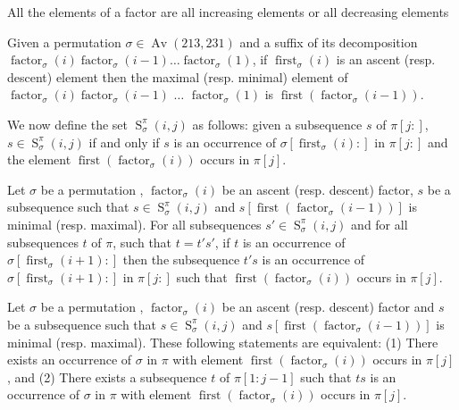 \documentclass[a4paper]{llncs}
\DeclareMathOperator{\AV}{Av}
\newcommand{\ptext}{\pi}
\newcommand{\pmotif}{\sigma}
\DeclareMathOperator{\firstia}{first}
\newcommand{\firsti}[2]{\firstia_{{#1}}({#2})}
\DeclareMathOperator{\factora}{factor}
\newcommand{\factor}[2]{\factora_{{#1}}({#2})}
\DeclareMathOperator{\firsta}{first}
\newcommand{\first}[2]{\firsta(\factor{#1}{#2})}
\DeclareMathOperator{\SETa}{S}
\newcommand{\SET}[4]{\SETa_{{#1}}^{{#2}}({#3},{#4})}
\begin{document}
\begin{remark}
All the elements of a factor are all increasing elements or all decreasing elements
\end{remark}

\begin{lemma}
\label{lemma:whereIsMax}
Given a permutation $\sigma \in \AV(213,231)$ and a suffix of its 
decomposition $\factor{\sigma}{i}\factor{\sigma}{i-1}\ldots$$\factor{\sigma}{1}$, 
if $\firsti{\sigma}{i}$ is an ascent (resp. descent) element then the maximal 
(resp. minimal) element of $\factor{\sigma}{i}\factor{\sigma}{i-1}$ $\ldots$ $\factor{\sigma}{1}$ is 
$\first{\sigma}{i-1}$.
\end{lemma}

We now define the set
$\SET{\pmotif}{\ptext}{i}{j}$ as follows:
given a subsequence $s$ of $\ptext[j:]$,
$s \in \SET{\pmotif}{\ptext}{i}{j}$ if and only if
$s$ is an occurrence of $\pmotif[\firsti{\pmotif}{i}:]$ in $\ptext[j:]$
and the element $\first{\pmotif}{i}$ occurs in $\ptext[j]$.

\begin{lemma}
\label{lemma:ts}
Let $\pmotif$ be a permutation , 
$\factor{\pmotif}{i}$ be an ascent (resp. descent) factor,
$s$ be a subsequence such that $s \in \SET{\pmotif}{\ptext}{i}{j}$ and $s[\first{\pmotif}{i-1}]$ is minimal (resp. maximal). 
For all subsequences 
$s' \in \SET{\pmotif}{\ptext}{i}{j}$ and for all subsequences $t$ of $\ptext$, such that $t=t's'$, if $t$ is an occurrence of $\pmotif[\firsti{\pmotif}{i+1}:]$ then the subsequence $t's$ is an occurrence of $\pmotif[\firsti{\pmotif}{i+1}:]$ in $\ptext[j:]$ such that $\first{\pmotif}{i}$ occurs in $\ptext[j]$.
\end{lemma}

\begin{corollary}
Let $\pmotif$ be a permutation , 
$\factor{\pmotif}{i}$ be an ascent (resp. descent) factor
and 
$s$ be a subsequence such that $s \in \SET{\pmotif}{\ptext}{i}{j}$ and $s[\first{\pmotif}{i-1}]$ is minimal (resp. maximal). 
These following statements are equivalent:
(1)
There exists an 
occurrence of $\pmotif$ in $\ptext$ with element $\first{\pmotif}{i}$ occurs in $\ptext[j]$,
and (2)
There exists a subsequence $t$ of $\ptext[1:j-1]$  such that $ts$ is 
an occurrence of $\pmotif$ in $\ptext$ with element $\first{\pmotif}{i}$ occurs 
in $\ptext[j]$. 
\end{corollary}

\end{document}
